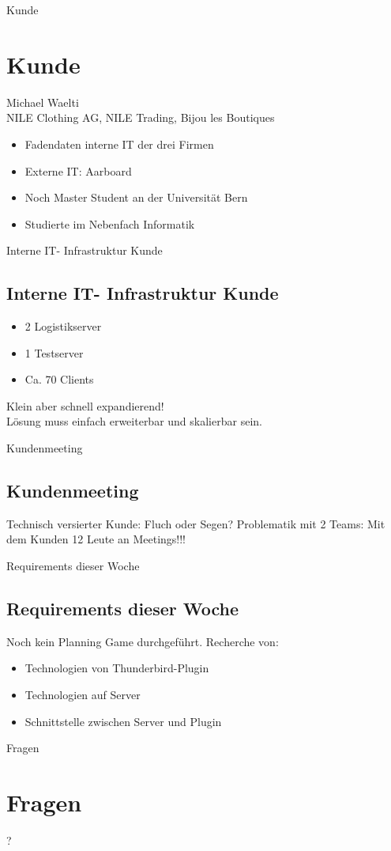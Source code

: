 \documentclass{beamer}
\begin{document}
\begin{frame}{Kunde}
\section{Kunde}
Michael Waelti\\
NILE Clothing AG, NILE Trading, Bijou les Boutiques
\bigbreak
\begin{itemize}
\item Fadendaten interne IT der drei Firmen
\item Externe IT: Aarboard
 \item Noch Master Student an der Universität Bern
 \item Studierte im Nebenfach Informatik
\end{itemize}
\end{frame}
\begin{frame}{Interne IT- Infrastruktur Kunde}
\subsection{Interne IT- Infrastruktur Kunde}
\begin{itemize}
\item 2 Logistikserver
\item 1 Testserver
\item Ca. 70 Clients
\bigbreak
\end{itemize}
Klein aber schnell expandierend!\\
Lösung muss einfach erweiterbar und skalierbar sein.
\end{frame}
\begin{frame}{Kundenmeeting}
\subsection{Kundenmeeting}
Technisch versierter Kunde: Fluch oder Segen?
\bigbreak
Problematik mit 2 Teams: Mit dem Kunden 12 Leute an Meetings!!!
\end{frame}
\begin{frame}{Requirements dieser Woche}
\subsection{Requirements dieser Woche}
Noch kein Planning Game durchgeführt.
\bigbreak
Recherche von:
\begin{itemize}
\item Technologien von Thunderbird-Plugin
\item Technologien auf Server
\item Schnittstelle zwischen Server und Plugin
\end{itemize}
\end{frame}
\begin{frame}{Fragen}
\section{Fragen}
 \begin{center}
\fontsize{60}{80}\selectfont ?
 \end{center}
\end{frame}
\end{document}
